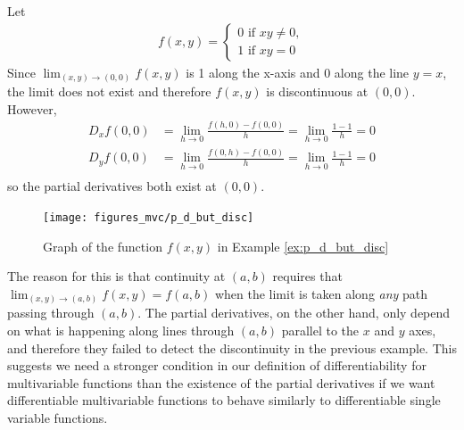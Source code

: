\documentclass[12pt,letterpaper,reqno]{article}
\numberwithin{equation}{section}
\begin{document}
{\begin{example}\label{ex:p_d_but_disc}
	Let
	\begin{align*}
		f(x,y)=\begin{cases}
			0 \text{ if } xy \neq 0, \\
			1 \text{ if } xy=0
		\end{cases}
	\end{align*}
Since $\lim_{(x,y) \to (0,0)}f(x,y)$ is 1 along the x-axis and $0$ along the line $y=x$, the limit does not exist and therefore $f(x,y)$ is discontinuous at $(0,0)$. However,
	\begin{align*}
		D_xf(0,0)&=\lim_{h \to 0}\frac{f(h,0)-f(0,0)}{h}=\lim_{h \to 0}\frac{1-1}{h}=0 \\
		D_yf(0,0)&=\lim_{h \to 0}\frac{f(0,h)-f(0,0)}{h}=\lim_{h \to 0}\frac{1-1}{h}=0 \\
	\end{align*}
so the partial derivatives both exist at $(0,0)$. 
\begin{figure}[h]
	\begin{center}
		\texttt{[image: figures\_mvc/p\_d\_but\_disc]}
	\end{center}
	\caption{Graph of the function $f(x,y)$ in Example \ref{ex:p_d_but_disc}}
\end{figure}
\end{example}
The reason for this is that continuity at $(a,b)$ requires that $\lim_{(x,y) \to (a,b)}f(x,y)=f(a,b)$ when the limit is taken along \emph{any} path passing through $(a,b)$. The partial derivatives, on the other hand, only depend on what is happening along lines through $(a,b)$ parallel to the $x$ and $y$ axes, and therefore they failed to detect the discontinuity in the previous example. This suggests we need a stronger condition in our definition of differentiability for multivariable functions than the existence of the partial derivatives if we want differentiable multivariable functions to behave similarly to differentiable single variable functions.

}
\end{document}
